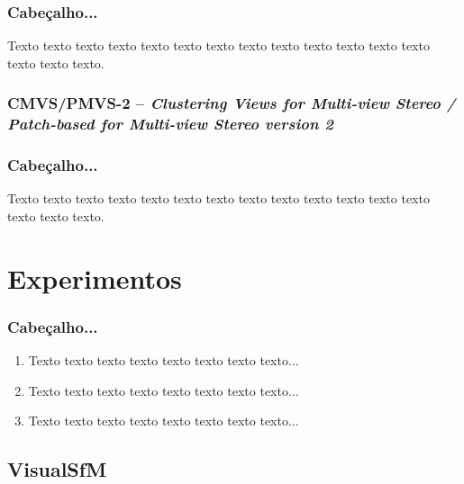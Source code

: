 \documentclass[table, usenames, svgnames, dvipsnames]{beamer}
\begin{document}
\begin{frame} 
\frametitle{\textbf{Cabeçalho...}}
	\begin{center}
		Texto texto texto texto texto texto texto texto texto texto texto texto texto
		texto texto texto.
	\end{center}
\end{frame}

\subsubsection{CMVS/PMVS-2 -- \emph{Clustering Views for Multi-view Stereo / Patch-based for Multi-view Stereo version 2}}

\begin{frame} 
\frametitle{\textbf{Cabeçalho...}}
	\begin{center}
		Texto texto texto texto texto texto texto texto texto texto texto texto texto
		texto texto texto.
	\end{center}
\end{frame}

\section{Experimentos}

\begin{frame}
\frametitle{Cabeçalho...}
	\begin{enumerate}
    	\item Texto texto texto texto texto texto texto texto...
		\\[0.5em]

    	\item Texto texto texto texto texto texto texto texto...
		\\[0.5em]
    	
		\item Texto texto texto texto texto texto texto texto...
		\\[0.5em]
	\end{enumerate}
\end{frame}

\subsection{VisualSfM}
\end{document}
